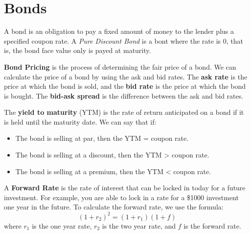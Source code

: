 \section{Bonds}
A bond is an obligation to pay a fixed amount of money to the lender plus a specified coupon rate. A \textit{Pure Discount Bond} is a bont where the rate is 0, that is, the bond face value only is payed at maturity.

\textbf{Bond Pricing} is the process of determining the fair price of a bond. We can calculate the price of a bond by using the ask and bid rates. The \textbf{ask rate} is the price at which the bond is sold, and the \textbf{bid rate} is the price at which the bond is bought. The \textbf{bid-ask spread} is the difference between the ask and bid rates.

The \textbf{yield to maturity} (YTM) is the rate of return anticipated on a bond if it is held until the maturity date. We can say that if:
\begin{itemize}
	\item The bond is selling at par, then the YTM = coupon rate.
	\item The bond is selling at a discount, then the YTM > coupon rate.
	\item The bond is selling at a premium, then the YTM < coupon rate.
\end{itemize}

A \textbf{Forward Rate} is the rate of interest that can be locked in today for a future investment. For example, you are able to lock in a rate for a \$1000 investment one year in the future. To calculate the forward rate, we use the formula:
$$
(1 + r_2)^2 = (1 + r_1)(1 + f)
$$
where $r_1$ is the one year rate, $r_2$ is the two year rate, and $f$ is the forward rate.

